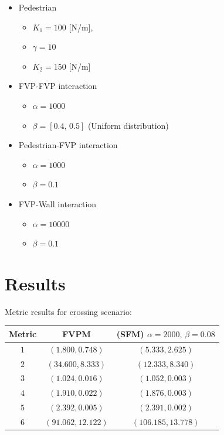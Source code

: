 \documentclass[draftclsnofoot]{IEEEtran}
\begin{document}
\begin{itemize}

\item Pedestrian
\begin{itemize}
    \item $K_{1}=100$ {[}N/m{]}, 
    \item $\gamma=10$
    \item $K_{2}=150$ {[}N/m{]}
\end{itemize}

\item FVP-FVP interaction
    \begin{itemize}
        \item $\alpha=1000$
        \item $\beta=[0.4,\,0.5]$ (Uniform distribution)
    \end{itemize}

    \item Pedestrian-FVP interaction
    \begin{itemize}
        \item $\alpha=1000$
        \item $\beta=0.1$
    \end{itemize}
    
    \item FVP-Wall interaction
    \begin{itemize}
        \item $\alpha=10000$
        \item $\beta=0.1$
    \end{itemize}
\end{itemize}

\section{Results}

Metric results for crossing scenario:

\begin{tabular}{|c|c|c|}
    \hline 
    Metric & {\scriptsize{FVPM}} & {\scriptsize{(SFM) $\alpha=2000,\,\beta=0.08$}}\tabularnewline
    \hline 
    \hline 
    $1$ & {\scriptsize{$(1.800,0.748)$}} & {\scriptsize{$(5.333,2.625)$}}\tabularnewline
    \hline 
    $2$ & {\scriptsize{$(34.600,8.333)$}} & {\scriptsize{$(12.333,8.340)$}}\tabularnewline
    \hline 
    $3$ & {\scriptsize{$(1.024,0.016)$}} & {\scriptsize{$(1.052,0.003)$}}\tabularnewline
    \hline 
    $4$ & {\scriptsize{$(1.910,0.022)$}} & {\scriptsize{$(1.876,0.003)$}}\tabularnewline
    \hline 
    $5$ & {\scriptsize{$(2.392,0.005)$}} & {\scriptsize{$(2.391,0.002)$}}\tabularnewline
    \hline 
    $6$ & {\scriptsize{$(91.062,12.122)$}} & {\scriptsize{$(106.185,13.778)$}}\tabularnewline
    \hline 
\end{tabular}
\end{document}
